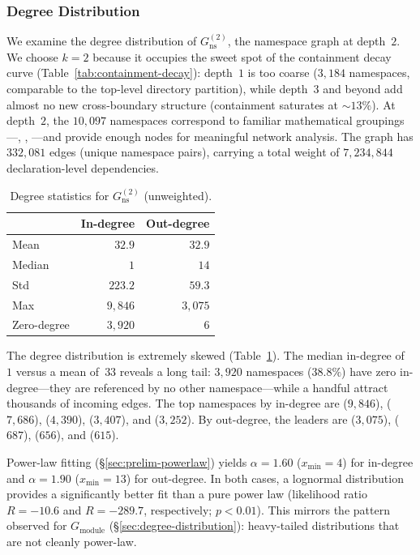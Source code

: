 \subsubsection{Degree Distribution}
\label{sec:ns-degree}

We examine the degree distribution of $G_{\mathrm{ns}}^{(2)}$, the namespace graph at depth~$2$. We choose $k = 2$ because it occupies the sweet spot of the containment decay curve (Table~\ref{tab:containment-decay}): depth~$1$ is too coarse ($3{,}184$ namespaces, comparable to the top-level directory partition), while depth~$3$ and beyond add almost no new cross-boundary structure (containment saturates at ${\sim}13\%$). At depth~$2$, the $10{,}097$ namespaces correspond to familiar mathematical groupings---, , ---and provide enough nodes for meaningful network analysis. The graph has $332{,}081$ edges (unique namespace pairs), carrying a total weight of $7{,}234{,}844$ declaration-level dependencies.

\begin{table}[ht]
\centering
\caption{Degree statistics for $G_{\mathrm{ns}}^{(2)}$ (unweighted).}
\label{tab:ns-degree-stats}
\begin{tabular}{lrr}
\toprule
& In-degree & Out-degree \\
\midrule
Mean        & $32.9$    & $32.9$ \\
Median      & $1$       & $14$ \\
Std         & $223.2$   & $59.3$ \\
Max         & $9{,}846$ & $3{,}075$ \\
Zero-degree & $3{,}920$ & $6$ \\
\bottomrule
\end{tabular}
\end{table}

The degree distribution is extremely skewed (Table~\ref{tab:ns-degree-stats}). The median in-degree of~$1$ versus a mean of~$33$ reveals a long tail: $3{,}920$ namespaces ($38.8\%$) have zero in-degree---they are referenced by no other namespace---while a handful attract thousands of incoming edges. The top namespaces by in-degree are  ($9{,}846$),  ($7{,}686$),  ($4{,}390$),  ($3{,}407$), and  ($3{,}252$). By out-degree, the leaders are  ($3{,}075$),  ($687$),  ($656$), and  ($615$).

Power-law fitting (\S\ref{sec:prelim-powerlaw}) yields $\alpha = 1.60$ ($x_{\min} = 4$) for in-degree and $\alpha = 1.90$ ($x_{\min} = 13$) for out-degree. In both cases, a lognormal distribution provides a significantly better fit than a pure power law (likelihood ratio $R = -10.6$ and $R = -289.7$, respectively; $p < 0.01$). This mirrors the pattern observed for $G_{\mathrm{module}}$ (\S\ref{sec:degree-distribution}): heavy-tailed distributions that are not cleanly power-law.

